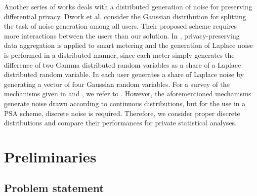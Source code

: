 \documentclass[10pt]{extarticle}
\begin{document}
Another series of works deals with a distributed generation of noise for preserving differential privacy. Dwork et al. \cite{14} consider the Gaussian distribution for splitting the task of noise generation among all users. Their proposed scheme requires more interactions between the users than our solution. In \cite{36}, privacy-preserving data aggregation is applied to smart metering and the generation of Laplace noise is performed in a distributed manner, since each meter simply generates the difference of two Gamma distributed random variables as a share of a Laplace distributed random variable. In \cite{19} each user generates a share of Laplace noise by generating a vector of four Gaussian random variables. For a survey of the mechanisms given in \cite{19} and \cite{36}, we refer to \cite{21}. However, the aforementioned mechanisms generate noise drawn according to continuous distributions, but for the use in a PSA scheme, discrete noise is required. Therefore, we consider proper discrete distributions and compare their performances for private statistical analyses.



\section{Preliminaries}

\subsection{Problem statement}
\end{document}
